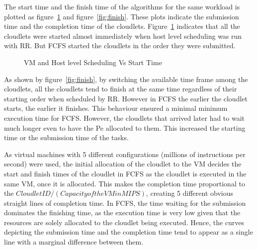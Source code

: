 \documentclass[times, 10pt,twocolumn]{article}
\begin{document}
The start time and the finish time of the algorithms for the same workload is plotted as figure~\ref{fig:start} and figure~\ref{fig:finish}. These plots indicate the submission time and the completion time of the cloudlets. Figure~\ref{fig:start} indicates that all the cloudlets were started almost immediately when host level scheduling was run with RR. But FCFS started the cloudlets in the order they were submitted. 
\begin{figure}[ht]
 \caption{VM and Host level Scheduling Vs Start Time}
 \label{fig:start}
\end{figure}

As shown by figure~\ref{fig:finish}, by switching the available time frame among the cloudlets, all the cloudlets tend to finish at the same time regardless of their starting order when scheduled by RR. However in FCFS the earlier the cloudlet starts, the earlier it finishes. This behaviour ensured a minimal minimum execution time for FCFS. However, the cloudlets that arrived later had to wait much longer even to have the Pe allocated to them. This increased the starting time or the submission time of the tasks. 

As virtual machines with 5 different configurations (millions of instructions per second) were used, the initial allocation of the cloudlet to the VM decides the start and finish times of the cloudlet in FCFS as the cloudlet is executed in the same VM, once it is allocated. This makes the completion time proportional to the $CloudletID/(Capacity of the VM in MIPS)$, creating 5 different obvious straight lines of completion time. In FCFS, the time waiting for the submission dominates the finishing time, as the execution time is very low given that the resources are solely allocated to the cloudlet being executed. Hence, the curves depicting the submission time and the completion time tend to appear as a single line with a marginal difference between them.
\end{document}
